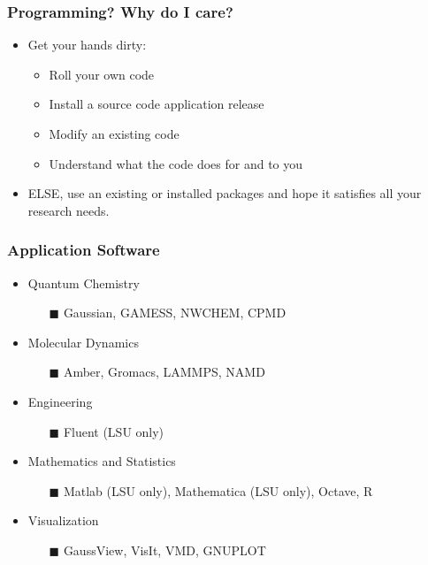 \documentclass[slidestop,mathserif,compress,xcolor=svgnames,table]{beamer}
\begin{document}
\begin{frame}
  \frametitle{\small Programming? Why do I care?}
  \begin{itemize}
    \item Get your hands dirty:
    \begin{itemize}
      \item Roll your own code
      \item Install a source code application release
      \item Modify an existing code
      \item Understand what the code does for and to you
    \end{itemize}
    \item ELSE, use an existing or installed packages and hope it satisfies all your research needs.
  \end{itemize}
\end{frame}

\begin{frame}
  \frametitle{\small Application Software}
  \begin{itemize}
    \item Quantum Chemistry
      \begin{enumerate}
        \item[$\blacksquare$] Gaussian, GAMESS, NWCHEM, CPMD
      \end{enumerate}
    \item Molecular Dynamics
      \begin{enumerate}
        \item[$\blacksquare$] Amber, Gromacs, LAMMPS, NAMD
      \end{enumerate}
    \item Engineering
      \begin{enumerate}
        \item[$\blacksquare$] Fluent (LSU only)
      \end{enumerate}
    \item Mathematics and Statistics
      \begin{enumerate}
        \item[$\blacksquare$] Matlab (LSU only), Mathematica (LSU only), Octave, R
      \end{enumerate}
    \item Visualization
      \begin{enumerate}
        \item[$\blacksquare$] GaussView, VisIt, VMD, GNUPLOT
      \end{enumerate}
  \end{itemize}
\end{frame}
\end{document}
